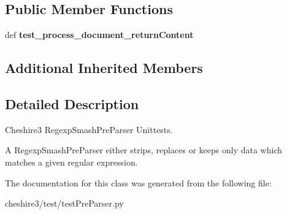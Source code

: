 \subsection*{Public Member Functions}
\begin{DoxyCompactItemize}
\item 
\hypertarget{classcheshire3_1_1test_1_1test_pre_parser_1_1_regexp_smash_pre_parser_test_case_a9f6f6c0d3c1ee910d499707bee33af89}{def {\bfseries test\-\_\-process\-\_\-document\-\_\-return\-Content}}\label{classcheshire3_1_1test_1_1test_pre_parser_1_1_regexp_smash_pre_parser_test_case_a9f6f6c0d3c1ee910d499707bee33af89}

\end{DoxyCompactItemize}
\subsection*{Additional Inherited Members}


\subsection{Detailed Description}
\begin{DoxyVerb}Cheshire3 RegexpSmashPreParser Unittests.

A RegexpSmashPreParser either strips, replaces or keeps only data which 
matches a given regular expression.
\end{DoxyVerb}
 

The documentation for this class was generated from the following file\-:\begin{DoxyCompactItemize}
\item 
cheshire3/test/test\-Pre\-Parser.\-py\end{DoxyCompactItemize}
